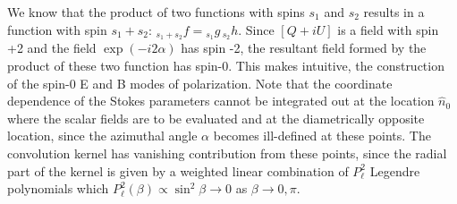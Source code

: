 We know that the product of two functions with spins $s_1$ and $s_2$ results in a function with spin $s_1 + s_2$: ${}_{s_1 +s_2}f = {}_{s_1}g \,{}_{s_2}h$. Since $[Q + iU]$ is a field with spin +2 and the field $\exp(-i2\alpha)$ has spin -2, the resultant field formed by the product of these two function has spin-0. This makes intuitive, the construction of the spin-0 E and B modes of polarization. Note that the coordinate dependence of the Stokes parameters cannot be integrated out at the location $\hat{n}_0$ where the scalar fields are to be evaluated and at the diametrically opposite location, since the azimuthal angle $\alpha$ becomes ill-defined at these points. The convolution kernel has vanishing contribution from these points, since the radial part of the kernel is given by a weighted linear combination of $P_{\ell}^2$ Legendre polynomials which $P_{\ell}^2(\beta) \propto \sin^2{\beta} \rightarrow 0 $ as $\beta \rightarrow 0 ,\pi$.  

